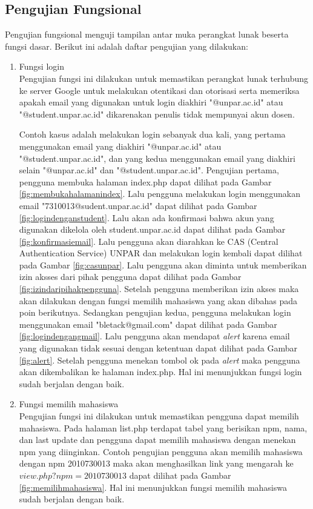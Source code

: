 \subsection{Pengujian Fungsional}
\label{sec:pengujianfungsional}
Pengujian fungsional menguji tampilan antar muka perangkat lunak beserta fungsi dasar. Berikut ini adalah daftar pengujian yang dilakukan:
\begin{enumerate}[(1)]
\item Fungsi login\\
    Pengujian fungsi ini dilakukan untuk memastikan perangkat lunak terhubung ke server Google untuk melakukan otentikasi dan otorisasi serta memeriksa apakah email yang digunakan untuk login diakhiri "@unpar.ac.id" atau "@student.unpar.ac.id" dikarenakan penulis tidak mempunyai akun dosen.
    
    Contoh kasus adalah melakukan login sebanyak dua kali, yang pertama menggunakan email yang diakhiri "@unpar.ac.id" atau "@student.unpar.ac.id", dan yang kedua menggunakan email yang diakhiri selain "@unpar.ac.id" dan "@student.unpar.ac.id". Pengujian pertama, pengguna membuka halaman index.php dapat dilihat pada Gambar \ref{fig:membukahalamanindex}. Lalu pengguna melakukan login menggunakan email "7310013@sudent.unpar.ac.id" dapat dilihat pada Gambar \ref{fig:logindenganstudent}. Lalu akan ada konfirmasi bahwa akun yang digunakan dikelola oleh student.unpar.ac.id dapat dilihat pada Gambar \ref{fig:konfirmasiemail}. Lalu pengguna akan diarahkan ke CAS (Central Authentication Service) UNPAR dan melakukan login kembali dapat dilihat pada Gambar \ref{fig:casunpar}. Lalu pengguna akan diminta untuk memberikan izin aksses dari pihak pengguna dapat dilihat pada Gambar \ref{fig:izindaripihakpengguna}. Setelah pengguna memberikan izin akses maka akan dilakukan dengan fungsi memilih mahasiswa yang akan dibahas pada poin berikutnya. Sedangkan pengujian kedua, pengguna melakukan login menggunakan email "bletack@gmail.com" dapat dilihat pada Gambar \ref{fig:logindengangmail}. Lalu pengguna akan mendapat {\it alert} karena email yang digunakan tidak sesuai dengan ketentuan dapat dilihat pada Gambar \ref{fig:alert}. Setelah pengguna menekan tombol ok pada {\it alert} maka pengguna akan dikembalikan ke halaman index.php. Hal ini menunjukkan fungsi login sudah berjalan dengan baik.

\item Fungsi memilih mahasiswa\\
	Pengujian fungsi ini dilakukan untuk memastikan pengguna dapat memilih mahasiswa. Pada halaman list.php terdapat tabel yang berisikan npm, nama, dan last update dan pengguna dapat memilih mahasiswa dengan menekan npm yang diinginkan. Contoh pengujian pengguna akan memilih mahasiswa dengan npm 2010730013 maka akan menghasilkan link yang mengarah ke $view.php?npm=2010730013$ dapat dilihat pada Gambar \ref{fig:memilihmahasiswa}. Hal ini menunjukkan fungsi memilih mahasiswa sudah berjalan dengan baik.
	

\end{enumerate}
